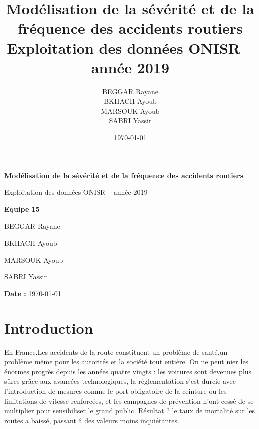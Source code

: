 \documentclass[11pt,a4paper]{article}
\title{\textbf{Modélisation de la sévérité et de la fréquence des accidents routiers}\\
\large Exploitation des données ONISR -- année 2019}
\author{
BEGGAR Rayane \\
BKHACH Ayoub \\
MARSOUK Ayoub \\
SABRI Yassir
}
\date{\today}
\begin{document}
\begin{titlepage}
    \centering
    \vspace*{2cm}

    {\LARGE \textbf{Modélisation de la sévérité et de la fréquence des accidents routiers}\par}
    \vspace{0.4cm}
    {\Large Exploitation des données ONISR -- année 2019\par}

    \vspace{2cm}

    {\large \textbf{Equipe 15}\par}
    \vspace{0.5cm}
    {\large
    BEGGAR Rayane \par
    BKHACH Ayoub \par
    MARSOUK Ayoub \par
    SABRI Yassir \par
    }

    \vfill

    {\large \textbf{Date :} \today\par}

    \vspace*{1cm}
\end{titlepage}

\tableofcontents
\newpage


\section{Introduction}
En France,Les accidents de la route constituent un problème de santé,un problème même pour les autorités et la société tout entière. On ne peut nier les énormes progrès depuis les années quatre vingts : les voitures sont devenues plus sûres grâce aux avancées technologiques, la réglementation s'est durcie avec l'introduction de mesures comme le port obligatoire de la ceinture ou les limitations de vitesse renforcées, et les campagnes de prévention n'ont cessé de se multiplier pour sensibiliser le grand public. Résultat ? le taux de mortalité sur les routes a baissé, passant â des valeurs moins inquiétantes.
\end{document}
